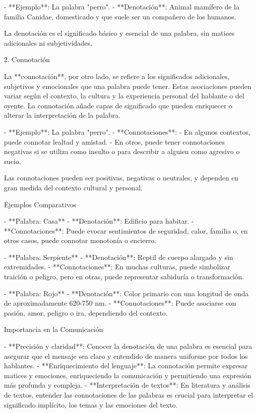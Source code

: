 - **Ejemplo**: La palabra "perro".
  - **Denotación**: Animal mamífero de la familia Canidae, domesticado y que suele ser un compañero de los humanos.

La denotación es el significado básico y esencial de una palabra, sin matices adicionales ni subjetividades.

 2. Connotación

La **connotación**, por otro lado, se refiere a los significados adicionales, subjetivos y emocionales que una palabra puede tener. Estas asociaciones pueden variar según el contexto, la cultura y la experiencia personal del hablante o del oyente. La connotación añade capas de significado que pueden enriquecer o alterar la interpretación de la palabra.

- **Ejemplo**: La palabra "perro".
  - **Connotaciones**:
    - En algunos contextos, puede connotar lealtad y amistad.
    - En otros, puede tener connotaciones negativas si se utiliza como insulto o para describir a alguien como agresivo o sucio.

Las connotaciones pueden ser positivas, negativas o neutrales, y dependen en gran medida del contexto cultural y personal.

 Ejemplos Comparativos

- **Palabra: Casa**
  - **Denotación**: Edificio para habitar.
  - **Connotaciones**: Puede evocar sentimientos de seguridad, calor, familia o, en otros casos, puede connotar monotonía o encierro.

- **Palabra: Serpiente**
  - **Denotación**: Reptil de cuerpo alargado y sin extremidades.
  - **Connotaciones**: En muchas culturas, puede simbolizar traición o peligro, pero en otras, puede representar sabiduría o transformación.

- **Palabra: Rojo**
  - **Denotación**: Color primario con una longitud de onda de aproximadamente 620-750 nm.
  - **Connotaciones**: Puede asociarse con pasión, amor, peligro o ira, dependiendo del contexto.

 Importancia en la Comunicación

- **Precisión y claridad**: Conocer la denotación de una palabra es esencial para asegurar que el mensaje sea claro y entendido de manera uniforme por todos los hablantes.
- **Enriquecimiento del lenguaje**: La connotación permite expresar matices y emociones, enriqueciendo la comunicación y permitiendo una expresión más profunda y compleja.
- **Interpretación de textos**: En literatura y análisis de textos, entender las connotaciones de las palabras es crucial para interpretar el significado implícito, los temas y las emociones del texto.

